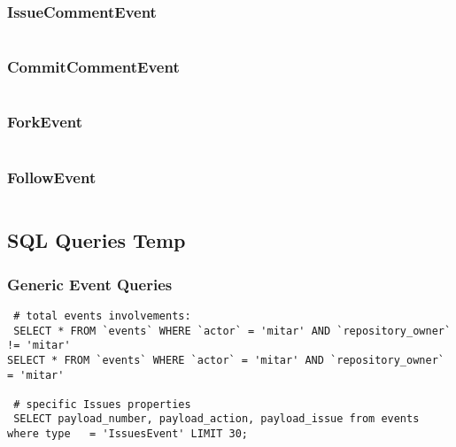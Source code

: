 \documentclass[a4paper,10pt]{article}
\begin{document}
\subsubsection{IssueCommentEvent}
\begin{lstlisting}

\end{lstlisting}

\subsubsection{CommitCommentEvent}
\begin{lstlisting}

\end{lstlisting}

\subsubsection{ForkEvent}
\begin{lstlisting}

\end{lstlisting}

\subsubsection{FollowEvent}
\begin{lstlisting}

\end{lstlisting}







\subsection{SQL Queries Temp}


\subsubsection{Generic Event Queries}
\begin{lstlisting}
 # total events involvements:
 SELECT * FROM `events` WHERE `actor` = 'mitar' AND `repository_owner` != 'mitar'
SELECT * FROM `events` WHERE `actor` = 'mitar' AND `repository_owner` = 'mitar'

 # specific Issues properties
 SELECT payload_number, payload_action, payload_issue from events where type   = 'IssuesEvent' LIMIT 30;

\end{lstlisting}
\end{document}
